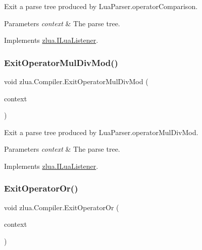 Exit a parse tree produced by Lua\+Parser.\+operator\+Comparison. 


\begin{DoxyParams}{Parameters}
{\em context} & The parse tree.\\
\hline
\end{DoxyParams}


Implements \mbox{\hyperlink{interfacezlua_1_1_i_lua_listener_a0c4de7c4814a744326fcf623c7ffc05c}{zlua.\+I\+Lua\+Listener}}.

\mbox{\label{classzlua_1_1_compiler_ab995afb210e4d04b7ebdcdd62f8f1541}} 
\subsubsection{\texorpdfstring{Exit\+Operator\+Mul\+Div\+Mod()}{ExitOperatorMulDivMod()}}
{\footnotesize\ttfamily void zlua.\+Compiler.\+Exit\+Operator\+Mul\+Div\+Mod (\begin{DoxyParamCaption}\item[{\mbox{[}\+Not\+Null\mbox{]} \mbox{\hyperlink{classzlua_1_1_lua_parser_1_1_operator_mul_div_mod_context}{Lua\+Parser.\+Operator\+Mul\+Div\+Mod\+Context}}}]{context }\end{DoxyParamCaption})}



Exit a parse tree produced by Lua\+Parser.\+operator\+Mul\+Div\+Mod. 


\begin{DoxyParams}{Parameters}
{\em context} & The parse tree.\\
\hline
\end{DoxyParams}


Implements \mbox{\hyperlink{interfacezlua_1_1_i_lua_listener_a67436f1864c243aabc07a339c1c96085}{zlua.\+I\+Lua\+Listener}}.

\mbox{\label{classzlua_1_1_compiler_a51d355ddfa730787d5353559db7acbce}} 
\subsubsection{\texorpdfstring{Exit\+Operator\+Or()}{ExitOperatorOr()}}
{\footnotesize\ttfamily void zlua.\+Compiler.\+Exit\+Operator\+Or (\begin{DoxyParamCaption}\item[{\mbox{[}\+Not\+Null\mbox{]} \mbox{\hyperlink{classzlua_1_1_lua_parser_1_1_operator_or_context}{Lua\+Parser.\+Operator\+Or\+Context}}}]{context }\end{DoxyParamCaption})}



